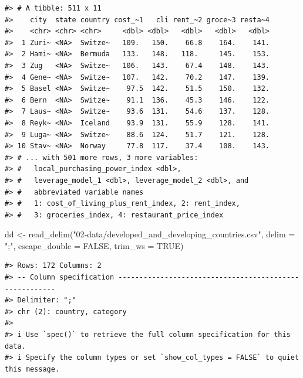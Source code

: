 \documentclass[
  11pt,
  a4paper,
  twoside]{scrbook}
\newenvironment{Shaded}{\begin{snugshade}}{\end{snugshade}}
\newcommand{\AttributeTok}[1]{\textcolor[rgb]{0.77,0.63,0.00}{#1}}
\newcommand{\ConstantTok}[1]{\textcolor[rgb]{0.00,0.00,0.00}{#1}}
\newcommand{\FunctionTok}[1]{\textcolor[rgb]{0.00,0.00,0.00}{#1}}
\newcommand{\NormalTok}[1]{#1}
\newcommand{\OtherTok}[1]{\textcolor[rgb]{0.56,0.35,0.01}{#1}}
\newcommand{\StringTok}[1]{\textcolor[rgb]{0.31,0.60,0.02}{#1}}
\begin{document}
\begin{verbatim}
#> # A tibble: 511 x 11
#>    city  state country cost_~1   cli rent_~2 groce~3 resta~4
#>    <chr> <chr> <chr>     <dbl> <dbl>   <dbl>   <dbl>   <dbl>
#>  1 Zuri~ <NA>  Switze~   109.   150.    66.8    164.    141.
#>  2 Hami~ <NA>  Bermuda   133.   148.   118.     145.    153.
#>  3 Zug   <NA>  Switze~   106.   143.    67.4    148.    143.
#>  4 Gene~ <NA>  Switze~   107.   142.    70.2    147.    139.
#>  5 Basel <NA>  Switze~    97.5  142.    51.5    150.    132.
#>  6 Bern  <NA>  Switze~    91.1  136.    45.3    146.    122.
#>  7 Laus~ <NA>  Switze~    93.6  131.    54.6    137.    128.
#>  8 Reyk~ <NA>  Iceland    93.9  131.    55.9    128.    141.
#>  9 Luga~ <NA>  Switze~    88.6  124.    51.7    121.    128.
#> 10 Stav~ <NA>  Norway     77.8  117.    37.4    108.    143.
#> # ... with 501 more rows, 3 more variables:
#> #   local_purchasing_power_index <dbl>,
#> #   leverage_model_1 <dbl>, leverage_model_2 <dbl>, and
#> #   abbreviated variable names
#> #   1: cost_of_living_plus_rent_index, 2: rent_index,
#> #   3: groceries_index, 4: restaurant_price_index
\end{verbatim}

\linespread{1}

\begin{Shaded}
\begin{Highlighting}[]

\NormalTok{dd }\OtherTok{\textless{}{-}} \FunctionTok{read\_delim}\NormalTok{(}\StringTok{"02{-}data/developed\_and\_developing\_countries.csv"}\NormalTok{, }
                                  \AttributeTok{delim =} \StringTok{";"}\NormalTok{, }\AttributeTok{escape\_double =} \ConstantTok{FALSE}\NormalTok{,}
                                  \AttributeTok{trim\_ws =} \ConstantTok{TRUE}\NormalTok{)}
\end{Highlighting}
\end{Shaded}

\linespread{1}

\begin{verbatim}
#> Rows: 172 Columns: 2
#> -- Column specification -------------------------------------------------------
#> Delimiter: ";"
#> chr (2): country, category
#> 
#> i Use `spec()` to retrieve the full column specification for this data.
#> i Specify the column types or set `show_col_types = FALSE` to quiet this message.
\end{verbatim}

\linespread{1}
\end{document}
